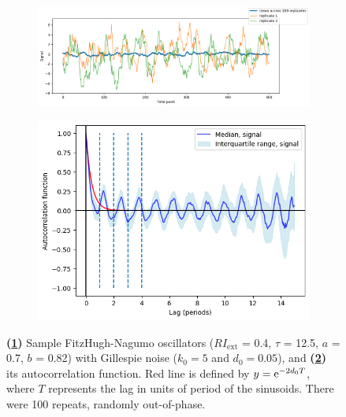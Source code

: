 \begin{figure}
  \centering
  \begin{subfigure}[t]{0.6\textwidth}
  \centering
    \includegraphics[width=\linewidth]{fhn_meanplot}
    \caption{
    }
    \label{fig:acf-fhn-gillnoise-ts}
  \end{subfigure}%
  \begin{subfigure}[t]{0.4\textwidth}
  \centering
    \includegraphics[width=\linewidth]{fhn_acf}
    \caption{
    }
    \label{fig:acf-fhn-gillnoise-acf}
  \end{subfigure}

  \caption[
    Sample FitzHugh-Nagumo oscillators with Gillespie noise, and
    its autocorrelation function.
  ]{
    \textbf{(\ref{fig:acf-fhn-gillnoise-ts})} Sample FitzHugh-Nagumo oscillators ($RI_{\mathrm{ext}}$ = 0.4, $\tau$ = 12.5, $a$ = 0.7, $b$ = 0.82) with Gillespie noise ($k_{0} = 5$ and $d_{0} = 0.05$), and 
    \textbf{(\ref{fig:acf-fhn-gillnoise-acf})} its autocorrelation function.
    Red line is defined by $y = \mathrm{e}^{-2d_{0}T}$, where $T$ represents the lag in units of period of the sinusoids.
    There were 100 repeats, randomly out-of-phase.
  }
  \label{fig:acf-fhn}
\end{figure}


